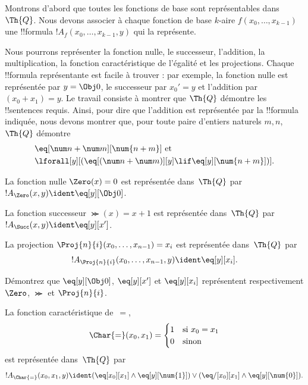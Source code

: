\documentclass[../../../include/open-logic-section]{subfiles}
\begin{document}

Montrons d'abord que toutes les fonctions de base sont
représentables dans~$\Th{Q}$. Nous devons associer à chaque
fonction de base $k$-aire $f(x_0,\dots,x_{k-1})$ une !!{formula}
$!A_f(x_0,\dots,x_{k-1},y)$ qui la représente.

Nous pourrons représenter la fonction nulle, le successeur,
l'addition, la multiplication, la fonction caractéristique de
l'égalité et les projections. Chaque !!{formula} représentante
est facile à trouver : par exemple, la fonction nulle est
représentée par $y=\Obj 0$, le successeur par $x_0'=y$ et
l'addition par $(x_0+x_1)=y$. Le travail consiste à montrer que
$\Th{Q}$ démontre les !!{sentence}s requis. Ainsi, pour dire que
l'addition est représentée par la !!{formula} indiquée, nous
devons montrer que, pour toute paire d'entiers naturels $m,n$,
$\Th{Q}$ démontre
\begin{align*}
& \eq[\num n + \num m][\num {n+m}] \text{ et}\\
& \lforall[y][(\eq[(\num n + \num m)][y] \lif \eq[y][\num{n+m}])].
\end{align*}

\begin{prop}
La fonction nulle $\Zero(x)=0$ est représentée dans~$\Th{Q}$ par
$!A_{\Zero}(x,y)\ident\eq[y][\Obj 0]$.
\end{prop}

\begin{prop}
La fonction successeur $\Succ(x)=x+1$ est représentée dans~$\Th{Q}$
par $!A_{\Succ}(x,y)\ident\eq[y][x']$.
\end{prop}

\begin{prop}
La projection $\Proj{n}{i}(x_0,\dots,x_{n-1})=x_i$ est
représentée dans~$\Th{Q}$ par
\[!A_{\Proj{n}{i}}(x_0, \dots, x_{n-1}, y) \ident \eq[y][x_i].\]
\end{prop}

\begin{prob}
Démontrez que $\eq[y][\Obj 0]$, $\eq[y][x']$ et $\eq[y][x_i]$
représentent respectivement $\Zero$, $\Succ$ et $\Proj{n}{i}$.
\end{prob}

\begin{prop}
La fonction caractéristique de~$=$,
\[
\Char{=}(x_0, x_1) =
\begin{cases}
  1 & \text{si } x_0 =x_1\\
  0 & \text{sinon}
\end{cases}
\]
est représentée dans~$\Th{Q}$ par
\[
  !A_{\Char{=}}(x_0, x_1, y) \ident (\eq[x_0][x_1] \land \eq[y][\num{1}]) \lor (\eq/[x_0][x_1] \land
\eq[y][\num{0}]).
\]
\end{prop}
\end{document}
